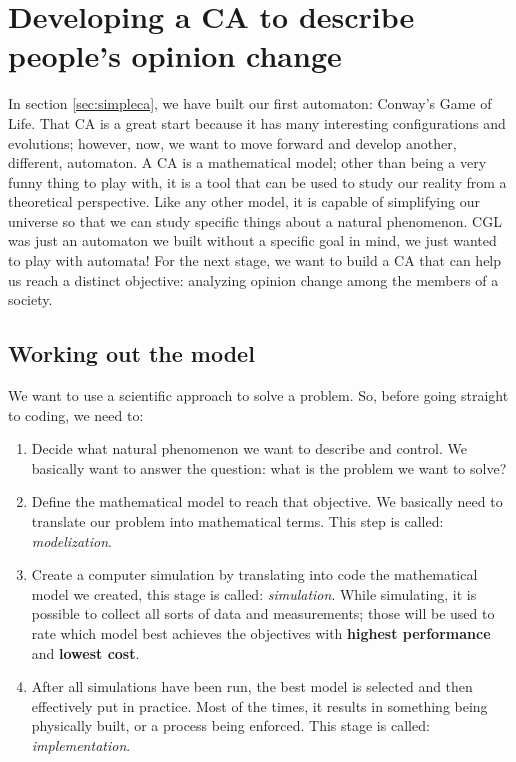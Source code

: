 
\section{Developing a CA to describe people's opinion change}
\label{sec:opinionca}

In section \ref{sec:simpleca}, we have built our first automaton: Conway's Game of Life.
That CA is a great start because it has many interesting configurations and evolutions;
however, now, we want to move forward and develop another, different, automaton.
A CA is a mathematical model; other than being a very funny thing to play with, it is a
tool that can be used to study our reality from a theoretical perspective. Like any other
model, it is capable of simplifying our universe so that we can study specific things
about a natural phenomenon. CGL was just an automaton we built without a specific goal
in mind, we just wanted to play with automata!
For the next stage, we want to build a CA that can help us reach a distinct objective:
analyzing opinion change among the members of a society.

\subsection{Working out the model}
We want to use a scientific approach to solve a problem. So, 
before going straight to coding, we need to:

\begin{enumerate}
\item Decide what natural phenomenon we want to describe and control. 
We basically want to answer the question: what is the problem we want to solve?
\item Define the mathematical model to reach that objective. We 
basically need to translate
our problem into mathematical terms. This step is called: \textit{modelization}.
\item Create a computer simulation by translating into code the mathematical
model we created, this stage is called: \textit{simulation}. While simulating,
it is possible to collect all sorts of data and measurements; those will be used
to rate which model best achieves the objectives with \textbf{highest performance} and
\textbf{lowest cost}.
\item After all simulations have been run, the best model is selected and then
effectively put in practice. Most of the times, it results in something being
physically built, or a process being enforced. This stage is called:
\textit{implementation}.
\end{enumerate}

